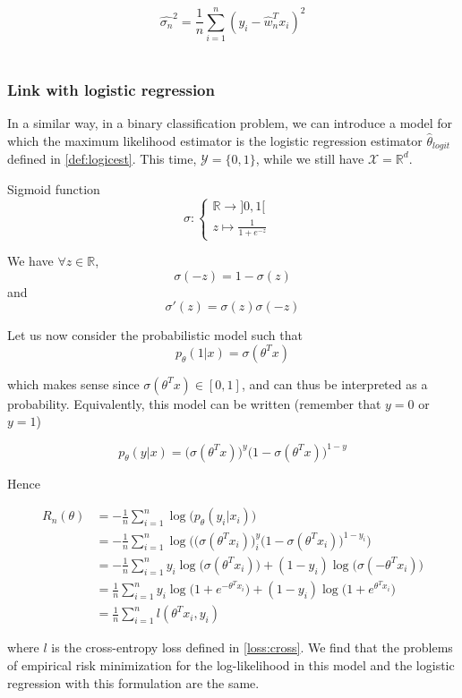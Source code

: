 \documentclass[
10pt, %
a4paper, %
oneside, %
headinclude,footinclude, %
BCOR5mm, %
]{scrartcl}
\begin{document}
\begin{equation*}
    \hat{\sigma_n}^2 = \frac{1}{n} \sum^{n}_{i=1} (y_i- \hat{w}_n^Tx_i)^2
\end{equation*}
\\

\subsubsection{\large\color{Periwinkle}Link with logistic regression}

In a similar way, in a binary classification problem, we can introduce a model for which the maximum likelihood estimator is the logistic regression estimator $\hat{\theta}_{logit}$ defined in \ref{def:logicest}. This time, $ \mathcal{Y} = \{0, 1\}$, while we still have $ \mathcal{X}=\mathbb{R}^d$.

\begin{definition}{Sigmoid function}
$$
\sigma  : \left\{
    \begin{array}{ll}
	\mathbb{R} \rightarrow ]0, 1[ \\
	z \mapsto \frac{1}{1+e^{-z}} & 
    \end{array}
\right.
$$

We have $\forall z\in \mathbb{R} $,
\begin{equation*}
    \sigma(-z) = 1- \sigma(z)
\end{equation*}
and
\begin{equation*}
    \sigma'(z) = \sigma(z)\sigma(-z)
\end{equation*}
\end{definition}

Let us now consider the probabilistic model such that
\begin{equation*}
    p_{\theta}(1|x) = \sigma(\theta^Tx)
\end{equation*}

which makes sense since $\sigma(\theta^Tx)\in [0, 1]$, and can thus be interpreted as a probability. Equivalently, this model can be written (remember that $y=0$ or $y=1$)

\begin{equation*}
    p_{\theta}(y|x) = \big(\sigma(\theta^Tx)\big)^y\big(1-\sigma(\theta^Tx) \big)^{1-y}
\end{equation*}

Hence 

\begin{equation*}
    \begin{aligned}
	R_n(\theta) &= - \frac{1}{n} \sum^{n}_{i=1} \log\big(p_{\theta}(y_i|x_i)\big)\\
	&=- \frac{1}{n} \sum^{n}_{i=1} \log\Big(\big(\sigma(\theta^Tx_i)\big)^y_i\big(1-\sigma(\theta^Tx_i) \big)^{1-y_i}\Big)\\
	&=- \frac{1}{n} \sum^{n}_{i=1} y_i\log\Big(\sigma(\theta^Tx_i)\Big)+ (1-y_i)\log\Big(\sigma(-\theta^Tx_i)\Big)\\
	&=\frac{1}{n} \sum^{n}_{i=1} y_i\log\Big(1+e^{-\theta^Tx_i}\Big)+ (1-y_i)\log\Big(1+e^{\theta^Tx_i}\Big)\\
	&=\frac{1}{n} \sum^{n}_{i=1} l(\theta^Tx_i,y_i)
    \end{aligned}
\end{equation*}

where $l$ is the cross-entropy loss defined in \ref{loss:cross}. We find that the problems of empirical risk minimization for the log-likelihood in this model and the logistic regression with this formulation are the same.


 
\end{document}
